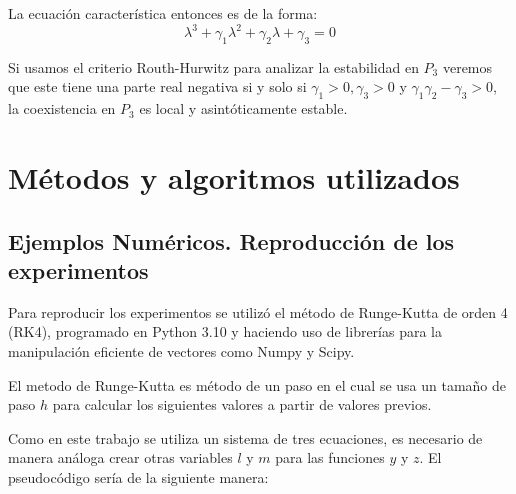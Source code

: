 \documentclass{wscpaperproc}
\theoremstyle{wsc}
\begin{document}
La ecuación característica entonces es de la forma:
$$\lambda^3+\gamma_1\lambda^2+\gamma_2\lambda+\gamma_3=0 $$

Si usamos el criterio Routh-Hurwitz para analizar la estabilidad en $P_3$ veremos que este
tiene una parte real negativa si y solo si $\gamma_1>0, \gamma_3>0$ y $\gamma_1\gamma_2-\gamma_3>0$, la coexistencia en $P_3$ es local
y asintóticamente estable.

\vspace*{3cm}


\section*{Métodos y algoritmos utilizados}


\subsection*{Ejemplos Numéricos. Reproducción de los experimentos}

Para reproducir los experimentos se utilizó el método de Runge-Kutta de orden 4 (RK4), programado
en Python 3.10 y haciendo uso de librerías para la manipulación eficiente de vectores como Numpy y
Scipy.

El metodo de Runge-Kutta es método de un paso en el cual se usa un tamaño de paso $h$ para calcular
los siguientes valores a partir de valores previos.

Como en este trabajo se utiliza un sistema de tres ecuaciones,
es necesario de manera análoga crear otras variables $l$ y $m$ para
las funciones $y$ y $z$. El pseudocódigo sería de la siguiente manera:
\end{document}
